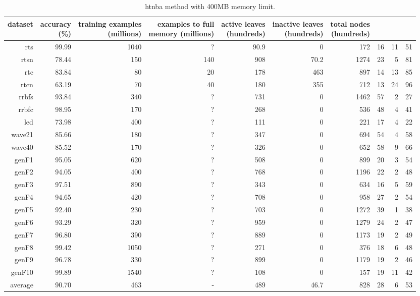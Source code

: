 \clearpage
\begin{table}
\caption{{\sc htnba} method with 400MB memory limit.}
\label{tab:htnba-400MB}
\centering
\begin{tabular}{|r|r|r|r|r|r|r|r|r|r|}
\hline
dataset	&
\rotatebox{90}{\parbox{9em}{accuracy\\(\%)}} &
\rotatebox{90}{\parbox{9em}{training examples\\(millions)}} &
\rotatebox{90}{\parbox{9em}{examples to full\\memory (millions)}} &
\rotatebox{90}{\parbox{9em}{active leaves\\(hundreds)}} &
\rotatebox{90}{\parbox{9em}{inactive leaves\\(hundreds)}} &
\rotatebox{90}{\parbox{9em}{total nodes\\(hundreds)}} &
\rotatebox{90}{\parbox{9em}{tree depth}}	&
\rotatebox{90}{\parbox{9em}{training speed (\%)}} &
\rotatebox{90}{\parbox{9em}{prediction speed (\%)}} \\
\hline
{\sc rts} & 99.99 & 1040 & ? & 90.9 & 0 & 172 & 16 & 11 & 51 \\
{\sc rtsn} & 78.44 & 150 & 140 & 908 & 70.2 & 1274 & 23 & 5 & 81 \\
{\sc rtc} & 83.84 & 80 & 20 & 178 & 463 & 897 & 14 & 13 & 85 \\
{\sc rtcn} & 63.19 & 70 & 40 & 180 & 355 & 712 & 13 & 24 & 96 \\
{\sc rrbfs} & 93.84 & 340 & ? & 731 & 0 & 1462 & 57 & 2 & 27 \\
{\sc rrbfc} & 98.95 & 170 & ? & 268 & 0 & 536 & 48 & 4 & 41 \\
{\sc led} & 73.98 & 400 & ? & 111 & 0 & 221 & 17 & 4 & 22 \\
{\sc wave21} & 85.66 & 180 & ? & 347 & 0 & 694 & 54 & 4 & 58 \\
{\sc wave40} & 85.52 & 170 & ? & 326 & 0 & 652 & 58 & 9 & 66 \\
{\sc genF1} & 95.05 & 620 & ? & 508 & 0 & 899 & 20 & 3 & 54 \\
{\sc genF2} & 94.05 & 400 & ? & 768 & 0 & 1196 & 22 & 2 & 48 \\
{\sc genF3} & 97.51 & 890 & ? & 343 & 0 & 634 & 16 & 5 & 59 \\
{\sc genF4} & 94.65 & 420 & ? & 708 & 0 & 958 & 27 & 2 & 54 \\
{\sc genF5} & 92.40 & 230 & ? & 703 & 0 & 1272 & 39 & 1 & 38 \\
{\sc genF6} & 93.29 & 320 & ? & 959 & 0 & 1279 & 24 & 2 & 47 \\
{\sc genF7} & 96.80 & 390 & ? & 889 & 0 & 1173 & 19 & 2 & 49 \\
{\sc genF8} & 99.42 & 1050 & ? & 271 & 0 & 376 & 18 & 6 & 48 \\
{\sc genF9} & 96.78 & 330 & ? & 899 & 0 & 1179 & 19 & 2 & 46 \\
{\sc genF10} & 99.89 & 1540 & ? & 108 & 0 & 157 & 19 & 11 & 42 \\
\hline
average & 90.70 & 463 &  -  & 489 & 46.7 & 828 & 28 & 6 & 53 \\
\hline
\end{tabular}
\end{table}
\clearpage
